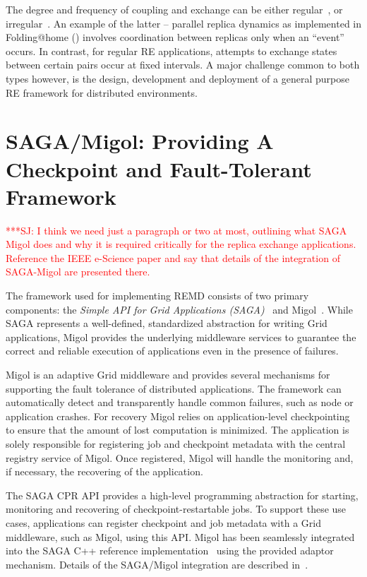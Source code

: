 \documentclass{rspublic}
\newcommand{\jhanote}[1]{ {\textcolor{red} { ***SJ: #1 }}}
\newcommand{\jhanote}[1]{}
\begin{document}
The degree and frequency of coupling and exchange can be either
regular~\citep{hansmann,Sugita:1999rm}, or
irregular~\citep{SPdynamics,pande_bj03}. An example of the latter --
parallel replica dynamics as implemented in Folding@home
(\citep{folding}) involves coordination between replicas only when an
``event'' occurs.  In contrast, for regular RE applications, attempts
to exchange states between certain pairs occur at fixed intervals. A
major challenge common to both types however, is the design,
development and deployment of a general purpose RE framework for
distributed environments.



\section{SAGA/Migol: Providing A Checkpoint and Fault-Tolerant
  Framework}\label{sec:sagamigol}

\jhanote{I think we need just a paragraph or two at most, outlining
  what SAGA Migol does and why it is required critically for the
  replica exchange applications. Reference the IEEE e-Science paper
  and say that details of the integration of SAGA-Migol are presented
  there.}

The framework used for implementing REMD consists of two primary
components: the \textit{Simple API for Grid Applications
  (SAGA)}~\citep{saga_gfd90} and Migol~\citep{schnorLuckow08}.  While
SAGA represents a well-defined, standardized abstraction for writing
Grid applications, Migol provides the underlying middleware services
to guarantee the correct and reliable exe\-cution of applications even
in the presence of failures.
    
Migol is an adaptive Grid middleware and provides several mechanisms
for supporting the fault tolerance of distributed applications. The
framework can automatically detect and transparently handle common
failures, such as node or application crashes. For recovery Migol
relies on application-level checkpointing to ensure that the amount of
lost computation is minimized. The application is solely responsible
for registering job and checkpoint metadata with the central registry
service of Migol. Once registered, Migol will handle the monitoring
and, if necessary, the recovering of the application.


The SAGA CPR API provides a high-level programming abstraction for
starting, monitoring and recovering of checkpoint-restartable jobs. To
support these use cases, applications can register checkpoint and job
metadata with a Grid middleware, such as Migol, using this API.
Migol has been seamlessly integrated into the SAGA C++ reference
implementation~\citep{Kaiser:2006qp} using the provided adaptor
mechanism. Details of the SAGA/Migol integration are described
in~\citet{Luckow:2008la}.
\end{document}
